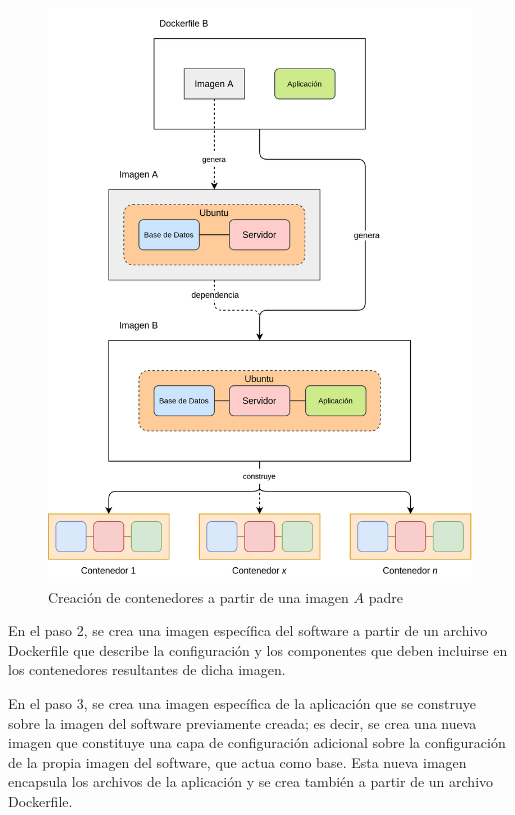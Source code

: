                 \begin{figure}[!htbp]
                    \centering

                    \includegraphics[scale=0.15]{images/Diagramas/Contenedor B.png}

                    \caption{Creación de contenedores a partir de una imagen $A$ padre}
                    \label{fig:contenedor-hijo}
                \end{figure}
                
                \newpage

                En el paso 2, se crea una imagen específica del software a partir de un archivo Dockerfile que describe la configuración y los componentes que deben incluirse en los contenedores resultantes de dicha imagen.

                En el paso 3, se crea una imagen específica de la aplicación que se construye sobre la imagen del software previamente creada; es decir, se crea una nueva imagen que constituye una capa de configuración adicional sobre la configuración de la propia imagen del software, que actua como base. Esta nueva imagen encapsula los archivos de la aplicación y se crea también a partir de un archivo Dockerfile.

